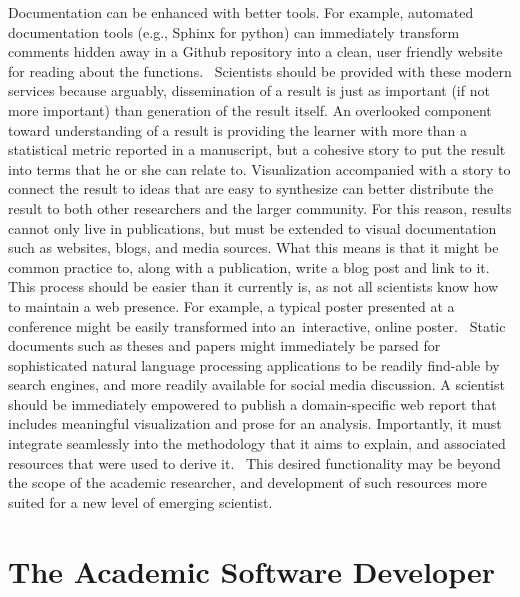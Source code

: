 \documentclass{report}
\begin{document}
Documentation can be enhanced with better tools. For example, automated
documentation tools (e.g., Sphinx for python) \cite{noauthor_undated-sh} can
immediately transform comments hidden away in a Github repository into a
clean, user friendly website for reading about the functions.
~Scientists should be provided with these modern services because
arguably, dissemination of a result is just as important (if not more
important) than generation of the result itself. An overlooked component
toward understanding of a result is providing the learner with more than
a statistical metric reported in a manuscript, but a cohesive story to
put the result into terms that he or she can relate to. Visualization
accompanied with a story to connect the result to ideas that are easy to
synthesize can better distribute the result to both other researchers
and the larger community. For this reason, results cannot only live in
publications, but must be extended to visual documentation such as
websites, blogs, and media sources. What this means is that it might be
common practice to, along with a publication, write a blog post and link
to it. This process should be easier than it currently is, as not all
scientists know how to maintain a web presence. For example, a typical
poster presented at a conference might be easily transformed into
an~interactive, online poster. ~Static documents such as theses and
papers might immediately be parsed for sophisticated natural language
processing applications \cite{Feng_Niu_Ce_Zhang_Christopher_Re_Jude_Shavlik_undated-fp} to
be readily find-able by search engines, and more readily available for
social media discussion. A scientist should be immediately empowered to
publish a domain-specific web report that includes meaningful
visualization and prose for an analysis. Importantly, it must integrate
seamlessly into the methodology that it aims to explain, and associated
resources that were used to derive it. ~This desired functionality may
be beyond the scope of the academic researcher, and development of such
resources more suited for a new level of emerging scientist.

\section{The Academic Software Developer}
\end{document}
